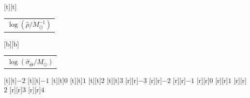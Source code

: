 %    
%
%
\begin{psfrags}%
\psfragscanon%
%
[t][t]{\color[rgb]{0,0,0}\setlength{\tabcolsep}{0pt}\begin{tabular}{c}{\Large$\log\left(\hat{\rho}/M_\odot^{-1}\right)$}\end{tabular}}%
[b][b]{\color[rgb]{0,0,0}\setlength{\tabcolsep}{0pt}\begin{tabular}{c}{\Large$\log\left(\hat{\sigma}_{\overline{\Theta}}/M_\odot\right)$}\end{tabular}}%
%
[t][t]{$-2$}%
[t][t]{$-1$}%
[t][t]{$0$}%
[t][t]{$1$}%
[t][t]{$2$}%
[t][t]{$3$}%
%
[r][r]{$-3$}%
[r][r]{$-2$}%
[r][r]{$-1$}%
[r][r]{$0$}%
[r][r]{$1$}%
[r][r]{$2$}%
[r][r]{$3$}%
[r][r]{$4$}%
%
%
\end{psfrags}%
%
